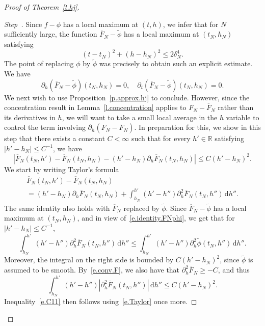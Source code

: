 \documentclass[AHL,Unicode,longabstracts,published]{cedram}
\newcommand{\R}{\mathbb{R}}
\renewcommand{\d}{\mathrm{d}}
\newcommand{\1}{\mathds{1}}
\renewcommand{\le}{\leqslant}
\renewcommand{\ge}{\geqslant}
\renewcommand{\bar}{\overline}
\newcommand{\td}{\widetilde}
\newcommand{\de}{\delta}
\newcounter{stepcount}
\newenvironment{step}{\refstepcounter{stepcount}\begin{proof}[Step~\thestepcount]}{\let\qed\relax\end{proof}}
\begin{document}
\begin{proof}[Proof of Theorem~\ref{t.hj}]
\begin{step}
Since $f-\phi$ has a local maximum at $(t,h)$, we infer that for $N$ sufficiently large, the function $\bar F_N - \td \phi$ has a local maximum at $(t_N,h_N)$ satisfying
\begin{equation}\label{e.bound.tNhN}
(t-t_N)^2 + (h-h_N)^2 \le 2 \de_N^4.
\end{equation}
The point of replacing $\phi$ by $\td \phi$ was precisely to obtain such an explicit estimate. We have
\begin{equation}\label{e.identity.FNphi}
\partial_h \left(\bar F_N - \td \phi\right)(t_N,h_N) = 0, \quad \partial_t \left(\bar F_N - \td \phi\right)(t_N,h_N) = 0.
\end{equation}
We next wish to use Proposition~\ref{p.approx.hj} to conclude. However, since the concentration result in Lemma~\ref{l.concentration} applies to $F_N - \bar F_N$ rather than its derivatives in $h$, we will want to take a small local average in the $h$ variable to control the term involving $\partial_h (F_N - \bar F_N)$. In preparation for this, we show in this step that there exists a constant $C < \infty$ such that for every $h' \in \R$ satisfying $|h'-h_N| \le C^{-1}$, we have
\begin{equation}\label{e.C11}
\left| \bar F_N(t_N,h') - \bar F_N(t_N,h_N) - (h'-h_N)\partial_h \bar F_N(t_N,h_N) \right| \le C (h'-h_N)^2.
\end{equation}
We start by writing Taylor's formula
\begin{multline}\label{e.Taylor}
\bar F_N(t_N,h') - \bar F_N(t_N,h_N)
\\
= (h'-h_N) \partial_h \bar F_N(t_N,h_N) + \int_{h_N}^{h'} (h'-h'') \partial_h^2 \bar F_N(t_N,h'') \, \d h''.
\end{multline}
The same identity also holds with $\bar F_N$ replaced by $\td \phi$. Since $\bar F_N - \td \phi$ has a local maximum at $(t_N,h_N)$, and in view of~\eqref{e.identity.FNphi}, we get that for $|h'-h_N|\le C^{-1}$,
\[
\int_{h_N}^{h'} (h'-h'') \partial_h^2 \bar F_N\left(t_N,h''\right) \, \d h'' \le \int_{h_N}^{h'} (h'-h'') \partial_h^2 \td \phi(t_N,h'') \, \d h''.
\]
Moreover, the integral on the right side is bounded by $C(h'-h_N)^2$, since $\td \phi$ is assumed to be smooth. By~\eqref{e.conv.F}, we also have that $\partial_h^2 \bar F_N \ge -C$, and thus
\[
\int_{h_N}^{h'} (h'-h'') \left|\partial_h^2 \bar F_N(t_N,h'')\right| \, \d h'' \le C (h'-h_N)^2.
\]
Inequality~\eqref{e.C11} then follows using~\eqref{e.Taylor} once more.
\end{step}


\end{proof}
\end{document}
